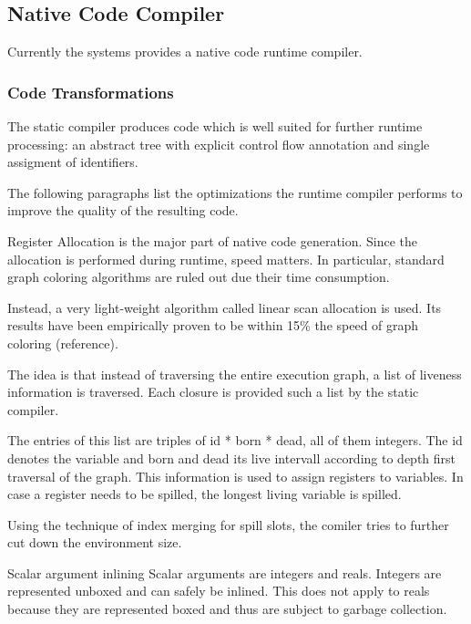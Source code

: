\subsection{Native Code Compiler}
Currently the systems provides a native code runtime compiler.
\subsubsection{Code Transformations}
The static compiler produces code which is well suited for further runtime
processing: an abstract tree with explicit control flow annotation
and single assigment of identifiers.

The following paragraphs list the optimizations the
runtime compiler performs to improve the
quality of the resulting code.
\begin{paragraph}{Register Allocation}
is the major part of native code generation.
Since the allocation is performed during runtime, speed matters.
In particular, standard graph coloring algorithms
are ruled out due their time consumption.

Instead, a very light-weight algorithm called linear scan allocation
is used. Its results have been empirically proven to be within 15\% the
speed of graph coloring (reference).

The idea is that instead of traversing the entire execution graph, a list
of liveness information is traversed. Each closure is provided such a list
by the static compiler.

The entries of this list are
triples of id * born * dead, all of them integers. The id denotes the variable
and born and dead its live intervall according to depth first traversal of
the graph. This information is used to assign registers to variables.
In case a register needs to be spilled, the longest living variable is spilled.

Using the technique of index merging for spill slots,
the comiler tries to further cut down the environment size.
\end{paragraph}
\begin{paragraph}{Scalar argument inlining}
Scalar arguments are integers and reals.
Integers are represented unboxed and can safely be inlined.
This does not apply to reals because they are represented boxed and thus
are subject to garbage collection.
\end{paragraph}
